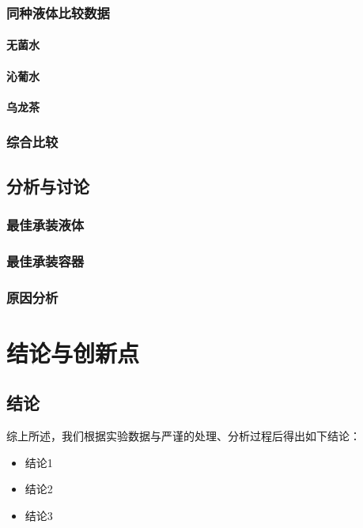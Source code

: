 \documentclass[12pt,a4paper]{article}
\begin{document}
\subsubsection{同种液体比较数据}
\paragraph{无菌水}

\paragraph{沁葡水}

\paragraph{乌龙茶}

\subsubsection{综合比较}

\subsection{分析与讨论}
\subsubsection{最佳承装液体}

\subsubsection{最佳承装容器}

\subsubsection{原因分析}

\section{结论与创新点}
\subsection{结论}
综上所述，我们根据实验数据与严谨的处理、分析过程后得出如下结论：
\begin{itemize}
    \item 结论1
    \item 结论2
    \item 结论3
\end{itemize}
\end{document}
